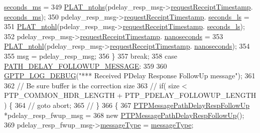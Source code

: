 \begin{DoxyCode}
{{{{{{{{      \hyperlink{class_timestamp_a5d98378d782519e6f9c17db70f1620f0}{seconds\_ms} =
349                 \hyperlink{linux_2src_2platform_8cpp_a6b8f3e7b87b66fa774a07ddc67f883a7}{PLAT\_ntohs}(pdelay\_resp\_msg->\hyperlink{class_p_t_p_message_path_delay_resp_a981c3fe148ecddf9f1091675650ccd48}{requestReceiptTimestamp}.
      \hyperlink{class_timestamp_a5d98378d782519e6f9c17db70f1620f0}{seconds\_ms});
350             pdelay\_resp\_msg->\hyperlink{class_p_t_p_message_path_delay_resp_a981c3fe148ecddf9f1091675650ccd48}{requestReceiptTimestamp}.
      \hyperlink{class_timestamp_a2bf200e58cd268d8b86cf93c51500a44}{seconds\_ls} =
351                 \hyperlink{linux_2src_2platform_8cpp_ad335681c3444e0406899693a6f782173}{PLAT\_ntohl}(pdelay\_resp\_msg->\hyperlink{class_p_t_p_message_path_delay_resp_a981c3fe148ecddf9f1091675650ccd48}{requestReceiptTimestamp}.
      \hyperlink{class_timestamp_a2bf200e58cd268d8b86cf93c51500a44}{seconds\_ls});
352             pdelay\_resp\_msg->\hyperlink{class_p_t_p_message_path_delay_resp_a981c3fe148ecddf9f1091675650ccd48}{requestReceiptTimestamp}.
      \hyperlink{class_timestamp_a78ae11d98fcfe738239d0a853d82c84a}{nanoseconds} =
353                 \hyperlink{linux_2src_2platform_8cpp_ad335681c3444e0406899693a6f782173}{PLAT\_ntohl}(pdelay\_resp\_msg->\hyperlink{class_p_t_p_message_path_delay_resp_a981c3fe148ecddf9f1091675650ccd48}{requestReceiptTimestamp}.
      \hyperlink{class_timestamp_a78ae11d98fcfe738239d0a853d82c84a}{nanoseconds});
354 
355             msg = pdelay\_resp\_msg;
356         \}
357         \textcolor{keywordflow}{break};
358     \textcolor{keywordflow}{case} \hyperlink{avbts__message_8hpp_ac6606ebe91c8ac66a2c314c79f5ab013adda4323fc121fba997bb5aa704a9dde8}{PATH\_DELAY\_FOLLOWUP\_MESSAGE}:
359 
360         \hyperlink{gptp__log_8hpp_ae4c6efe7c9cf6d7d3bbd28a0fd087d61}{GPTP\_LOG\_DEBUG}(\textcolor{stringliteral}{"*** Received PDelay Response FollowUp message"});
361 
362         \textcolor{comment}{// Be sure buffer is the correction size}
363 \textcolor{comment}{//     if( size < PTP\_COMMON\_HDR\_LENGTH + PTP\_PDELAY\_FOLLOWUP\_LENGTH ) \{}
364 \textcolor{comment}{//       goto abort;}
365 \textcolor{comment}{//     \}}
366         \{
367             \hyperlink{class_p_t_p_message_path_delay_resp_follow_up}{PTPMessagePathDelayRespFollowUp} *pdelay\_resp\_fwup\_msg =
368                 \textcolor{keyword}{new} \hyperlink{class_p_t_p_message_path_delay_resp_follow_up}{PTPMessagePathDelayRespFollowUp}();
369             pdelay\_resp\_fwup\_msg->\hyperlink{class_p_t_p_message_common_adb32627aa5b0e2dbad3ccd88aab07c05}{messageType} = \hyperlink{class_p_t_p_message_common_adb32627aa5b0e2dbad3ccd88aab07c05}{messageType};
}}}}}}}}
\end{DoxyCode}
